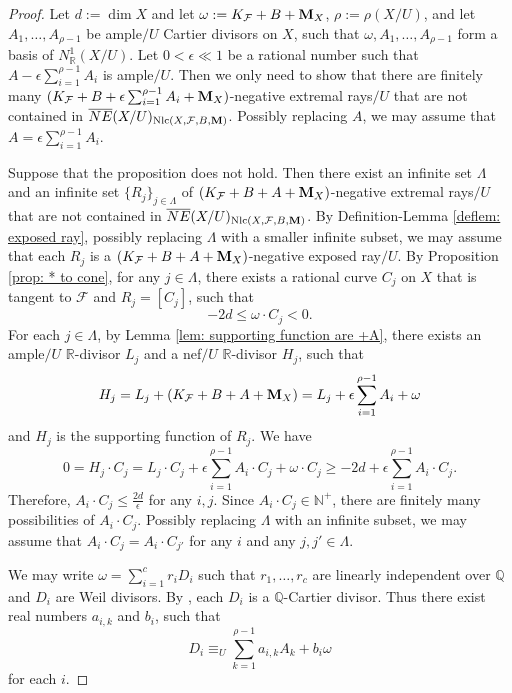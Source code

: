 \documentclass[11pt]{amsart}
\numberwithin{equation}{section}
\newcommand{\Mm}{{\bf{M}}}
\newcommand{\Qq}{\mathbb{Q}}
\newcommand{\Rr}{\mathbb{R}}
\newcommand{\Nlc}{\operatorname{Nlc}}
\newcommand{\Ff}{\mathcal{F}}
\theoremstyle{definition}
\theoremstyle{definition}
\theoremstyle{definition}
\begin{document}
\begin{proof}
Let $d:=\dim X$ and let $\omega:=K_{\Ff}+B+\Mm_X$, $\rho:=\rho(X/U)$, and let $A_1,\dots,A_{\rho-1}$ be ample$/U$ Cartier divisors on $X$, such that $\omega,A_1,\dots,A_{\rho-1}$ form a basis of $N^1_{\mathbb R}(X/U)$. Let $0<\epsilon\ll 1$ be a rational number such that $A-\epsilon\sum_{i=1}^{\rho-1}A_i$ is ample$/U$. Then we only need to show that there are finitely many $(K_{\Ff}+B+\epsilon\sum_{i=1}^{\rho-1}A_i+\Mm_X)$-negative extremal rays$/U$ that are not contained in $\overline{NE}(X/U)_{\Nlc(X,\Ff,B,\Mm)}$. Possibly replacing $A$, we may assume that $A=\epsilon\sum_{i=1}^{\rho-1}A_i$.

Suppose that the proposition does not hold. Then there exist an infinite set $\Lambda$ and an infinite set $\{R_j\}_{j\in\Lambda}$ of $(K_{\Ff}+B+A+\Mm_X)$-negative extremal rays$/U$ that are not contained in $\overline{NE}(X/U)_{\Nlc(X,\Ff,B,\Mm)}$. By Definition-Lemma \ref{deflem: exposed ray}, possibly replacing $\Lambda$ with a smaller infinite subset, we may assume that each $R_j$ is a  $(K_{\Ff}+B+A+\Mm_X)$-negative exposed ray$/U$. By Proposition \ref{prop: * to cone}, for any $j\in\Lambda$, there exists a rational curve $C_j$ on $X$ that is tangent to $\Ff$ and $R_j=[C_j]$, such that 
$$-2d\leq \omega\cdot C_j<0.$$ 
For each $j\in\Lambda$, by Lemma \ref{lem: supporting function are +A}, there exists an ample$/U$ $\Rr$-divisor $L_j$ and a nef$/U$ $\Rr$-divisor $H_j$, such that
$$H_j=L_j+(K_{\Ff}+B+A+\Mm_X)=L_j+\epsilon\sum_{i=1}^{\rho-1}A_i+\omega$$
and $H_j$ is the supporting function of $R_j$. We have
$$0=H_j\cdot C_j=L_j\cdot C_j+\epsilon\sum_{i=1}^{\rho-1}A_i\cdot C_j+\omega\cdot C_j\geq-2d+\epsilon\sum_{i=1}^{\rho-1}A_i\cdot C_j.$$
Therefore, $A_i\cdot C_j\leq\frac{2d}{\epsilon}$ for any $i,j$. Since $A_i\cdot C_j\in\mathbb N^+$, there are finitely many possibilities of $A_i\cdot C_j$. Possibly replacing $\Lambda$ with an infinite subset, we may assume that $A_i\cdot C_j=A_i\cdot C_{j'}$ for any $i$ and any $j,j'\in\Lambda$.

We may write $\omega=\sum_{i=1}^c r_iD_i$ such that $r_1,\dots,r_c$ are linearly independent over $\Qq$ and $D_i$ are Weil divisors.  By \cite[Lemma 5.3]{HLS19}, each $D_i$ is a $\Qq$-Cartier divisor. Thus there exist real numbers $a_{i,k}$ and $b_i$, such that
$$D_i\equiv_U\sum_{k=1}^{\rho-1}a_{i,k}A_k+b_i\omega$$
for each $i$. 
    

\end{proof}
\end{document}
